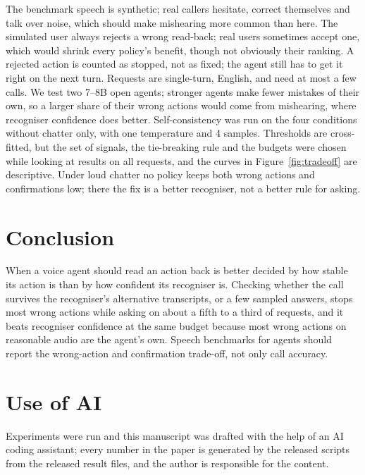 \documentclass[11pt]{article}
\begin{document}
The benchmark speech is synthetic; real callers hesitate, correct themselves and talk over noise, which should make mishearing more common than here. The simulated user always rejects a wrong read-back; real users sometimes accept one, which would shrink every policy's benefit, though not obviously their ranking. A rejected action is counted as stopped, not as fixed; the agent still has to get it right on the next turn. Requests are single-turn, English, and need at most a few calls. We test two 7--8B open agents; stronger agents make fewer mistakes of their own, so a larger share of their wrong actions would come from mishearing, where recogniser confidence does better. Self-consistency was run on the four conditions without chatter only, with one temperature and 4 samples. Thresholds are cross-fitted, but the set of signals, the tie-breaking rule and the budgets were chosen while looking at results on all requests, and the curves in Figure~\ref{fig:tradeoff} are descriptive. Under loud chatter no policy keeps both wrong actions and confirmations low; there the fix is a better recogniser, not a better rule for asking.

\section{Conclusion}

When a voice agent should read an action back is better decided by how stable its action is than by how confident its recogniser is. Checking whether the call survives the recogniser's alternative transcripts, or a few sampled answers, stops most wrong actions while asking on about a fifth to a third of requests, and it beats recogniser confidence at the same budget because most wrong actions on reasonable audio are the agent's own. Speech benchmarks for agents should report the wrong-action and confirmation trade-off, not only call accuracy.

\section*{Use of AI}
Experiments were run and this manuscript was drafted with the help of an AI coding assistant; every number in the paper is generated by the released scripts from the released result files, and the author is responsible for the content.



\appendix
\end{document}
